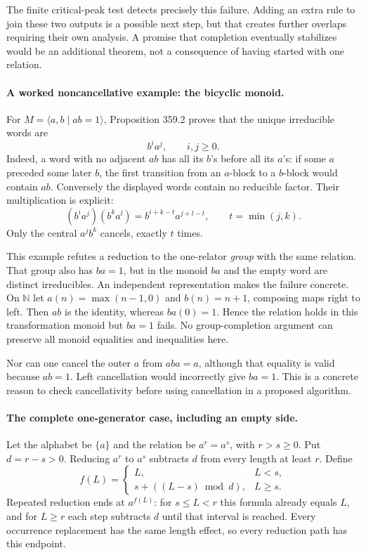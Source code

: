 \documentclass[11pt]{article}
\begin{document}
The finite critical-peak test detects precisely this failure. Adding
an extra rule to join these two outputs is a possible next step, but
that creates further overlaps requiring their own analysis. A promise
that completion eventually stabilizes would be an additional theorem,
not a consequence of having started with one relation.

\paragraph{A worked noncancellative example: the bicyclic monoid.}
For $M=\langle a,b\mid ab=1\rangle$, Proposition 359.2 proves that
the unique irreducible words are
\[
 b^i a^j,\qquad i,j\ge0.
\]
Indeed, a word with no adjacent $ab$ has all its $b$'s before all its
$a$'s: if some $a$ preceded some later $b$, the first transition from
an $a$-block to a $b$-block would contain $ab$. Conversely the displayed
words contain no reducible factor. Their multiplication is explicit:
\[
 (b^ia^j)(b^ka^l)=b^{i+k-t}a^{j+l-t},
 \qquad t=\min(j,k).
 \tag{359.2}
\]
Only the central $a^jb^k$ cancels, exactly $t$ times.

This example refutes a reduction to the one-relator \emph{group}
with the same relation. That group also has $ba=1$, but in the monoid
$ba$ and the empty word are distinct irreducibles. An independent
representation makes the failure concrete. On $\mathbb N$ let
$a(n)=\max(n-1,0)$ and $b(n)=n+1$, composing maps right to left.
Then $ab$ is the identity, whereas $ba(0)=1$. Hence the relation holds
in this transformation monoid but $ba=1$ fails. No group-completion
argument can preserve all monoid equalities and inequalities here.

Nor can one cancel the outer $a$ from $aba=a$, although that equality
is valid because $ab=1$. Left cancellation would incorrectly give
$ba=1$. This is a concrete reason to check cancellativity before using
cancellation in a proposed algorithm.

\paragraph{The complete one-generator case, including an empty side.}
Let the alphabet be $\{a\}$ and the relation be $a^r=a^s$, with
$r>s\ge0$. Put $d=r-s>0$. Reducing $a^r$ to $a^s$ subtracts $d$
from every length at least $r$. Define
\[
 f(L)=\begin{cases}
 L,&L<s,\\
 s+((L-s)\bmod d),&L\ge s.
 \end{cases}
\]
Repeated reduction ends at $a^{f(L)}$: for $s\le L<r$ this formula
already equals $L$, and for $L\ge r$ each step subtracts $d$ until
that interval is reached. Every occurrence replacement has the same
length effect, so every reduction path has this endpoint.
\end{document}
